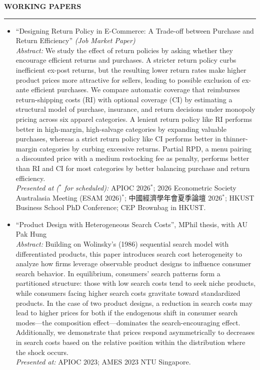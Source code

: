 \documentclass[11pt,letterpaper]{article}
\newcommand{\sectionheader}[1]{%
  \vspace{0.55em}
  {\large\bfseries #1}\\[-0.15em]
  \rule{\textwidth}{0.4pt}\par
  \vspace{0.25em}
}
\begin{document}
\vspace{-0.55em}
\sectionheader{WORKING PAPERS}
\begin{itemize}
  \item ``Designing Return Policy in E-Commerce: A Trade-off between Purchase and Return Efficiency'' \textit{(Job Market Paper)}\\[0.2em]
  \textit{Abstract:} We study the effect of return policies by asking whether they encourage efficient returns and purchases. A stricter return policy curbs inefficient ex-post returns, but the resulting lower return rates make higher product prices more attractive for sellers, leading to possible exclusion of ex-ante efficient purchases. We compare automatic coverage that reimburses return-shipping costs (RI) with optional coverage (CI) by estimating a structural model of purchase, insurance, and return decisions under monopoly pricing across six apparel categories. A lenient return policy like RI performs better in high-margin, high-salvage categories by expanding valuable purchases, whereas a strict return policy like CI performs better in thinner-margin categories by curbing excessive returns. Partial RPD, a menu pairing a discounted price with a medium restocking fee as penalty, performs better than RI and CI for most categories by better balancing purchase and return efficiency.\\[0.2em]
  \textit{Presented at ($^{\ast}$ for scheduled):} APIOC 2026$^{\ast}$; 2026 Econometric Society Australasia Meeting (ESAM 2026)$^{\ast}$; 中國經濟學年會夏季論壇 2026$^{\ast}$; HKUST Business School PhD Conference; CEP Brownbag in HKUST.

  \item ``Product Design with Heterogeneous Search Costs'', MPhil thesis, with AU Pak Hung\\[0.2em]
  \textit{Abstract:} Building on Wolinsky's (1986) sequential search model with differentiated products, this paper introduces search cost heterogeneity to analyze how firms leverage observable product designs to influence consumer search behavior. In equilibrium, consumers' search patterns form a partitioned structure: those with low search costs tend to seek niche products, while consumers facing higher search costs gravitate toward standardized products. In the case of two product designs, a reduction in search costs may lead to higher prices for both if the endogenous shift in consumer search modes---the composition effect---dominates the search-encouraging effect. Additionally, we demonstrate that prices respond asymmetrically to decreases in search costs based on the relative position within the distribution where the shock occurs.\\[0.2em]
  \textit{Presented at:} APIOC 2023; AMES 2023 NTU Singapore.
\end{itemize}
\end{document}
